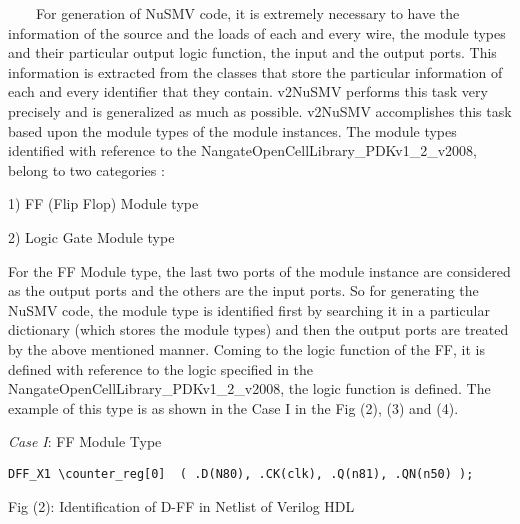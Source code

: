 \documentclass[a4paper]{article}
\begin{document}
{\color[rgb]{0.0,0.0,0.039215688}
\textrm{\ \ }\textrm{\ \ For generation of NuSMV code, it is extremely
necessary to have the information of the source and the loads of each
and every wire, the module types and their particular output logic
function, the input and the output ports. This information is extracted
from the classes that store the particular information of each and
every identifier that they contain. v2NuSMV performs this task very
precisely and is generalized as much as possible. v2NuSMV accomplishes
this task based upon the module types of the module instances. The
module types identified with reference to the
NangateOpenCellLibrary\_PDKv1\_2\_v2008, belong to two categories :\ }}

{\color[rgb]{0.0,0.0,0.039215688}
\textrm{1) FF (Flip Flop) Module type\ }}

{\color[rgb]{0.0,0.0,0.039215688}
\textrm{2) Logic Gate Module type\ }}

{\color[rgb]{0.0,0.0,0.039215688}
\textrm{For the FF Module type, the last two ports of the module
instance are considered as the output ports and the others are the
input ports. So for generating the NuSMV code, the module type is
identified first by searching it in a particular dictionary (which
stores the module types) and then the output ports are treated by the
above mentioned manner. Coming to the logic function of the FF, it is
defined with reference to the logic specified in the
NangateOpenCellLibrary\_PDKv1\_2\_v2008, the logic function is defined.
The example of this type is as shown in the Case I in the Fig (2), (3)
and (4).\ }}

{\color[rgb]{0.0,0.0,0.039215688}
\textrm{\textit{Case I}}\textrm{: FF Module Type}}


\bigskip

{\centering \par}

\begin{center}
\begin{minipage}{5.98194in}
{\centering\color[rgb]{0.0,0.0,0.039215688}
\texttt{DFF\_X1 {\textbackslash}counter\_reg[0] \ ( .D(N80), .CK(clk),
.Q(n81), .QN(n50) );}
\par}


\bigskip
\end{minipage}
\end{center}
{\centering\color[rgb]{0.0,0.0,0.039215688}
\textrm{Fig (2): Identification of D-FF in Netlist of Verilog HDL}
\par}
\end{document}
